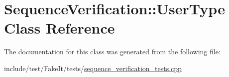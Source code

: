 \hypertarget{classSequenceVerification_1_1UserType}{}\section{Sequence\+Verification\+::User\+Type Class Reference}
\label{classSequenceVerification_1_1UserType}


The documentation for this class was generated from the following file\+:\begin{DoxyCompactItemize}
\item 
include/test/\+Fake\+It/tests/\mbox{\hyperlink{sequence__verification__tests_8cpp}{sequence\+\_\+verification\+\_\+tests.\+cpp}}\end{DoxyCompactItemize}
